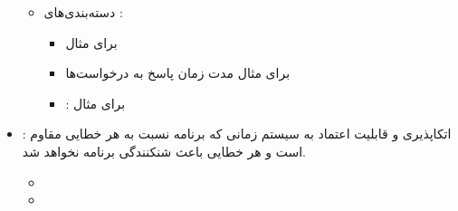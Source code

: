 \begin{itemize}
\begin{itemize}
        \item دسته‌بندی‌های :
        \begin{itemize}
            \item {} برای مثال 
            \item {} برای مثال مدت زمان پاسخ به درخواست‌ها
            \item {}: برای مثال 
        \end{itemize}
    \end{itemize}
    \item {}: اتکاپذیری و قابلیت اعتماد به سیستم زمانی که برنامه
    نسبت به هر خطایی مقاوم است و هر خطایی باعث شنکنندگی برنامه نخواهد شد.
    \begin{itemize}
        \item {}
        \item {}
    \end{itemize}
\end{itemize}